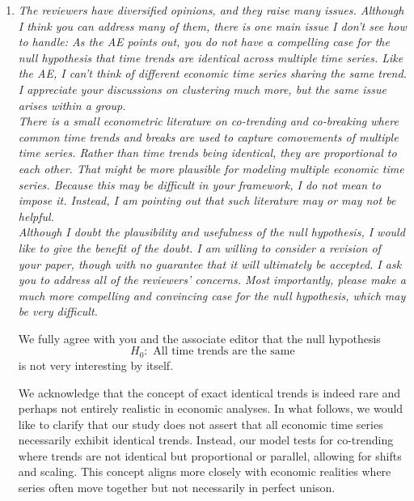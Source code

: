 \documentclass[a4paper,12pt]{article}
\begin{document}
\begin{enumerate}[label=\arabic*.,leftmargin=0.6cm]


\item \textit{The reviewers have diversified opinions, and they raise many issues. Although I think you can address many of them, there is one main issue I don’t see how to handle: As the AE points out, you do not have a compelling case for the null hypothesis that time trends are identical across multiple time series. Like the AE, I can’t think of different economic time series sharing the same trend.  I appreciate your discussions on clustering much more, but the same issue arises within a group. \\
There is a small econometric literature on co-trending and co-breaking where common time trends and breaks are used to capture comovements of multiple time series. Rather than time trends being identical, they are proportional to each other. That might be more plausible for modeling multiple economic time series. Because this may be difficult in your framework, I do not mean to impose it.  Instead, I am pointing out that such literature may or may not be helpful. \\
Although I doubt the plausibility and usefulness of the null hypothesis, I would like to give the benefit of the doubt. I am willing to consider a revision of your paper, though with no guarantee that it will ultimately be accepted. I ask you to address all of the reviewers' concerns. Most importantly, please make a much more compelling and convincing case for the null hypothesis, which may be very difficult. %
}

We fully agree with you and the associate editor that the null hypothesis
\[ H_0: \text{ All time trends are the same} \]
is not very interesting by itself. {\color{red}We acknowledge that the concept of exact identical trends is indeed rare and perhaps not entirely realistic in economic analyses. In what follows, we would like to clarify that our study does not assert that all economic time series necessarily exhibit identical trends. Instead, our model tests for co-trending where trends are not identical but proportional or parallel, allowing for shifts and scaling. This concept aligns more closely with economic realities where series often move together but not necessarily in perfect unison.


}
\end{enumerate}
\end{document}
